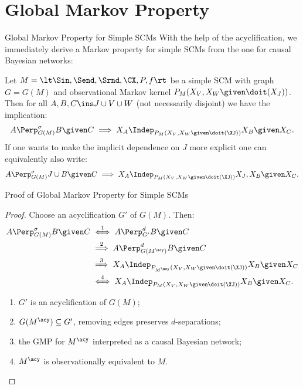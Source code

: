 \part{Global Markov Property}
\frame{\partpage}

\begin{frame}{Global Markov Property for Simple SCMs}
  With the help of the acyclification, we immediately derive a Markov property for simple SCMs from the one for causal Bayesian networks:
  \begin{Cor}
  Let $M = \lt \Sin, \Send, \Srnd, \CX, P, f \rt$ be a simple SCM with graph $G = G(M)$
  and observational Markov kernel $P_{M}(X_V,X_W \given \doit(X_J))$.
  Then for all $A, B, C \ins J \cup V \cup W$ (not necessarily disjoint) we have the implication:
  $$A \Perp^\sigma_{G(M)} B \given C \implies X_A \Indep_{P_{M}(X_V,X_W \given \doit(\XJ))} X_B \given X_C.$$
  If one wants to make the implicit dependence on $J$ more explicit one can equivalently also write:
    $$A \Perp^\sigma_{G(M)} J \cup B \given C \implies X_A \Indep_{P_{M}(X_V,X_W \given \doit(\XJ))} X_J,X_B \given X_C.$$
\end{Cor}
\end{frame}
\begin{frame}{Proof of Global Markov Property for Simple SCMs}
\begin{proof}
  \setlength\abovedisplayskip{10pt}
  \setlength\belowdisplayskip{0pt}
  Choose an acyclification $G'$ of $G(M)$. Then:
  \begin{align*}
    A \Perp^\sigma_{G(M)} B \given C &\stackrel{1}{\iff} A \Perp^d_{G'} B \given C \\
    &\stackrel{2}{\implies} A \Perp^d_{G(M^\acy)} B \given C \\
    &\stackrel{3}{\implies} X_A \Indep_{P_{M^{\acy}}(X_V,X_W \given \doit(\XJ))} X_B \given X_C \\
    &\stackrel{4}{\iff} X_A \Indep_{P_{M}(X_V,X_W \given \doit(\XJ))} X_B \given X_C.
  \end{align*}
  \begin{enumerate}
    \item $G'$ is an acyclification of $G(M)$; 
    \item $G(M^\acy) \subseteq G'$, removing edges preserves $d$-separations; 
    \item the GMP for $M^\acy$ interpreted as a causal Bayesian network;
    \item $M^\acy$ is observationally equivalent to $M$.
  \end{enumerate}
\end{proof}
\end{frame}


